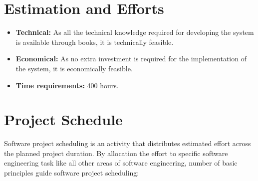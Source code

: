 \section{Estimation and Efforts}
\begin{itemize} 
 \item \textbf{Technical:} As all the technical knowledge required for developing the system is available through books, it is 
technically feasible. 
 \item \textbf{Economical:} As no extra investment is required for the implementation of the system, it is economically feasible.
 \item \textbf{Time requirements:} 400 hours. 
\end{itemize}

\section{Project Schedule} 
\hspace*{0.82cm}Software project scheduling is an activity that distributes estimated effort across the planned project duration. 
By allocation the effort to specific software engineering task like all other areas of software engineering, number of basic 
principles guide software project scheduling:
